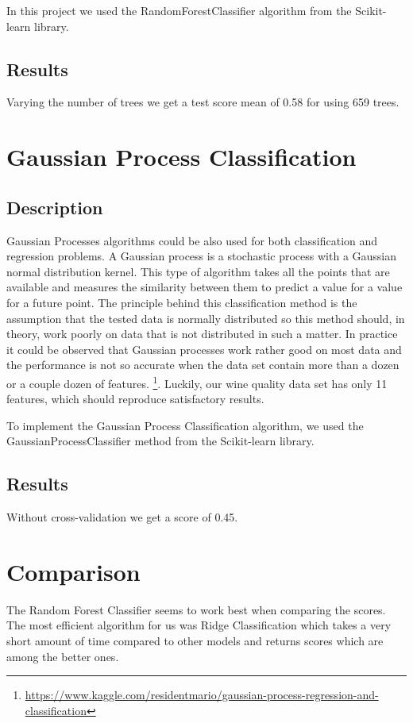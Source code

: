 \documentclass[twocolumn]{scrartcl}
\begin{document}
In this project we used the RandomForestClassifier algorithm from the Scikit-learn library.
\subsection{Results}
Varying the number of trees we get a test score mean of 0.58 for using 659 trees.

\section{Gaussian Process Classification}
\subsection{Description}
Gaussian Processes algorithms could be also used for both classification and regression problems. A Gaussian process is a stochastic process with a Gaussian normal distribution kernel. This type of algorithm takes all the points that are available and measures the similarity between them to predict a value for a value for a future point.
The principle behind this classification method is the assumption that the tested data is normally distributed so this method should, in theory, work poorly on data that is not distributed in such a matter. In practice it could be observed that Gaussian processes work rather good on most data and the performance is not so accurate when the data set contain more than a dozen or a couple dozen of features.
\footnote{\url{https://www.kaggle.com/residentmario/gaussian-process-regression-and-classification}}.
Luckily, our wine quality data set has only 11 features, which should reproduce satisfactory results.

To implement the Gaussian Process Classification algorithm, we used the GaussianProcessClassifier method from the Scikit-learn library.

\subsection{Results}

Without cross-validation we get a score of 0.45.

\section{Comparison}

The Random Forest Classifier seems to work best when comparing the scores. The most efficient algorithm for us was Ridge Classification which takes a very short amount of time compared to other models and returns scores which are among the better ones.
\end{document}

